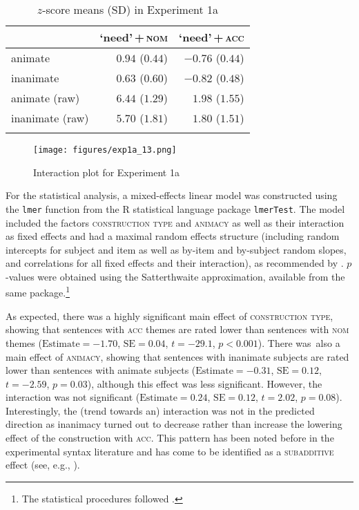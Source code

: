 \documentclass[output=paper]{langscibook}
\begin{document}
\begin{table}
\centering
\begin{tabular}{lrr}
\lsptoprule
 & `need'\,+\,\textsc{nom} & `need'\,+\,\textsc{acc}\\
\midrule
animate  &   $0.94$ ($0.44$) &   $-0.76$ ($0.44$)\\
inanimate  &   $0.63$ ($0.60$) &   $-0.82$ ($0.48$)\\
animate (raw)  &   $6.44$ ($1.29$) &   $1.98$ ($1.55$)\\
inanimate (raw)  &   $5.70$ ($1.81$) &   $1.80$ ($1.51$)\\
\lspbottomrule
\end{tabular}
\caption{$z$-score means (SD) in Experiment 1a}
\label{tab:1:means-exp1a}
\end{table}

\begin{figure}
\caption{Interaction plot for Experiment 1a}
\centering
\texttt{[image: figures/exp1a\_13.png]}
\label{fig:exp1a}
\end{figure}

For the statistical analysis, a mixed-effects linear model was constructed using the \texttt{lmer} function from the R statistical language package \texttt{lmerTest}. The model included the factors \textsc{construction type} and \textsc{animacy} as well as their interaction as fixed effects and had a maximal random effects structure (including random intercepts for subject and item as well as by-item and by-subject random slopes, and correlations for all fixed effects and their interaction), as recommended by \citet{Barr.Levy2013}. $p$-values were obtained using the Satterthwaite approximation, available from the same package.\footnote{The statistical procedures followed \citet{Keshev.meltzerAsscher2019}.}

As expected, there was a highly significant main effect of \textsc{construction type}, showing that sentences with \textsc{acc} themes are rated lower than sentences with \textsc{nom} themes ($\text{Estimate} = -1.70$, $\text{SE} = 0.04$, $t = -29.1$, $p < 0.001$). There was~also a main effect of \textsc{animacy}, showing that sentences with inanimate subjects are rated lower than sentences with animate subjects ($\text{Estimate} = -0.31$, $\text{SE} = 0.12$,  $t = -2.59$, $p = 0.03$), although this effect was less significant. However, the interaction was not significant ($\text{Estimate} = 0.24$, $\text{SE} = 0.12$, $t = 2.02$, $p = 0.08$). Interestingly, the (trend towards an) interaction was not in the predicted direction as inanimacy turned out to decrease rather than increase the lowering effect of the construction with \textsc{acc}. This pattern has been noted before in the experimental syntax literature and has come to be identified as a \textsc{subadditive} effect (see, e.g., \citealt{Stepanov.Music.Stateva2018}).
\end{document}
